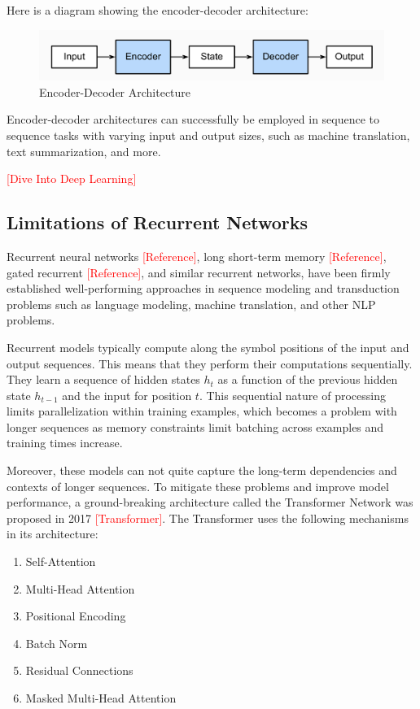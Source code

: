 \documentclass[11pt,twoside]{article}
\begin{document}
Here is a diagram showing the encoder-decoder architecture:

\begin{figure}[h]
    \centering
    \includegraphics[width=0.65\linewidth]{fig/enc-dec.png}
    \caption{Encoder-Decoder Architecture}
\end{figure}

Encoder-decoder architectures can successfully be employed in sequence to sequence tasks with varying input and output sizes, such as machine translation, text summarization, and more. 

\textcolor{red}{[Dive Into Deep Learning]}

\subsection{Limitations of Recurrent Networks}
Recurrent neural networks \textcolor{red}{[Reference]}, long short-term memory \textcolor{red}{[Reference]}, gated recurrent \textcolor{red}{[Reference]}, and similar recurrent networks, have been firmly established well-performing approaches in sequence modeling and transduction problems such as language modeling, machine translation, and other NLP problems.

Recurrent models typically compute along the symbol positions of the input and output sequences. This means that they perform their computations sequentially. They learn a sequence of hidden states $h_t$ as a function of the previous hidden state $h_{t-1}$ and the input for position $t$. This sequential nature of processing limits parallelization within training examples, which becomes a problem with longer sequences as memory constraints limit batching across examples and training times increase. 

Moreover, these models can not quite capture the long-term dependencies and contexts of longer sequences. To mitigate these problems and improve model performance, a ground-breaking architecture called the Transformer Network was proposed in 2017 \textcolor{red}{[Transformer]}. The Transformer uses the following mechanisms in its architecture: \\[-20pt]
\begin{enumerate}
    \item Self-Attention \\[-20pt]
    \item Multi-Head Attention \\[-20pt]
    \item Positional Encoding \\[-20pt]
    \item Batch Norm \\[-20pt]
    \item Residual Connections \\[-20pt]
    \item Masked Multi-Head Attention \\[-20pt]
\end{enumerate}
\end{document}

